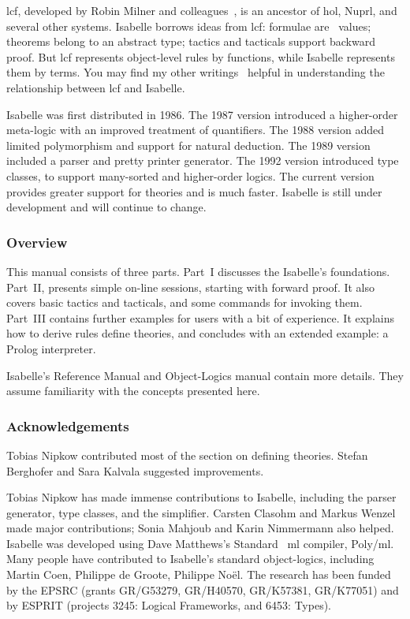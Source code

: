 \documentclass[12pt]{article}
\begin{document}
{\sc lcf}, developed by Robin Milner and colleagues~\cite{mgordon79}, is an
ancestor of {\sc hol}, Nuprl, and several other systems.  Isabelle borrows
ideas from {\sc lcf}: formulae are~\ML{} values; theorems belong to an
abstract type; tactics and tacticals support backward proof.  But {\sc lcf}
represents object-level rules by functions, while Isabelle represents them
by terms.  You may find my other writings~\cite{paulson87,paulson-handbook}
helpful in understanding the relationship between {\sc lcf} and Isabelle.

 Isabelle was first distributed in 1986.
The 1987 version introduced a higher-order meta-logic with an improved
treatment of quantifiers.  The 1988 version added limited polymorphism and
support for natural deduction.  The 1989 version included a parser and
pretty printer generator.  The 1992 version introduced type classes, to
support many-sorted and higher-order logics.  The current version provides
greater support for theories and is much faster.  Isabelle is still under
development and will continue to change.

\subsubsection*{Overview} 
This manual consists of three parts.  Part~I discusses the Isabelle's
foundations.  Part~II, presents simple on-line sessions, starting with
forward proof.  It also covers basic tactics and tacticals, and some
commands for invoking them.  Part~III contains further examples for users
with a bit of experience.  It explains how to derive rules define theories,
and concludes with an extended example: a Prolog interpreter.

Isabelle's Reference Manual and Object-Logics manual contain more details.
They assume familiarity with the concepts presented here.


\subsubsection*{Acknowledgements} 
Tobias Nipkow contributed most of the section on defining theories.
Stefan Berghofer and Sara Kalvala suggested improvements.

Tobias Nipkow has made immense contributions to Isabelle, including the
parser generator, type classes, and the simplifier.  Carsten Clasohm and
Markus Wenzel made major contributions; Sonia Mahjoub and Karin Nimmermann
also helped.  Isabelle was developed using Dave Matthews's Standard~{\sc
  ml} compiler, Poly/{\sc ml}.  Many people have contributed to Isabelle's
standard object-logics, including Martin Coen, Philippe de Groote, Philippe
No\"el.  The research has been funded by the EPSRC (grants
GR/G53279, GR/H40570, GR/K57381, GR/K77051)
and by ESPRIT (projects 3245: Logical Frameworks, and 6453: Types).
\end{document}
